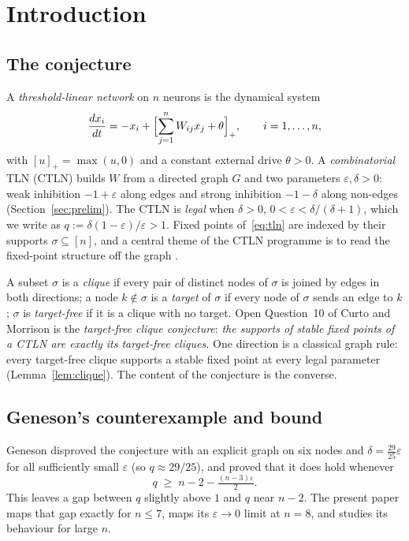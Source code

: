 \documentclass[11pt]{article}
\theoremstyle{definition}
\newcommand{\eps}{\varepsilon}
\begin{document}
\section{Introduction}\label{sec:intro}

\subsection{The conjecture}
A \emph{threshold-linear network} on $n$ neurons is the dynamical system
\begin{equation}\label{eq:tln}
\frac{dx_i}{dt}=-x_i+\Bigl[\sum_{j=1}^n W_{ij}x_j+\theta\Bigr]_+,\qquad i=1,\dots,n,
\end{equation}
with $[u]_+=\max(u,0)$ and a constant external drive $\theta>0$. A \emph{combinatorial} TLN (CTLN)
builds $W$ from a directed graph $G$ and two parameters $\eps,\delta>0$: weak inhibition $-1+\eps$
along edges and strong inhibition $-1-\delta$ along non-edges (Section~\ref{sec:prelim}). The CTLN is
\emph{legal} when $\delta>0$, $0<\eps<\delta/(\delta+1)$, which we write as $q:=\delta(1-\eps)/\eps>1$.
Fixed points of~\eqref{eq:tln} are indexed by their supports $\sigma\subseteq[n]$, and a central theme of
the CTLN programme is to read the fixed-point structure off the graph \cite{CurtoMorrison2023}.

A subset $\sigma$ is a \emph{clique} if every pair of distinct nodes of $\sigma$ is joined by edges in
both directions; a node $k\notin\sigma$ is a \emph{target} of $\sigma$ if every node of $\sigma$ sends an
edge to $k$; $\sigma$ is \emph{target-free} if it is a clique with no target. Open Question~10 of
Curto and Morrison \cite{CurtoMorrison2023} is the \emph{target-free clique conjecture}: \emph{the
supports of stable fixed points of a CTLN are exactly its target-free cliques.} One direction is a
classical graph rule: every target-free clique supports a stable fixed point at every legal parameter
(Lemma~\ref{lem:clique}). The content of the conjecture is the converse.

\subsection{Geneson's counterexample and bound}
Geneson \cite{Geneson2026} disproved the conjecture with an explicit graph on six nodes and
$\delta=\tfrac{29}{25}\eps$ for all sufficiently small $\eps$ (so $q\approx 29/25$), and proved
that it does hold whenever
\begin{equation}\label{eq:geneson-bound}
q\;\ge\; n-2-\tfrac{(n-3)\eps}{2}.
\end{equation}
This leaves a gap between $q$ slightly above $1$ and $q$ near $n-2$. The present paper maps that gap
exactly for $n\le7$, maps its $\eps\to0$ limit at $n=8$, and studies its behaviour for large $n$.
\end{document}
